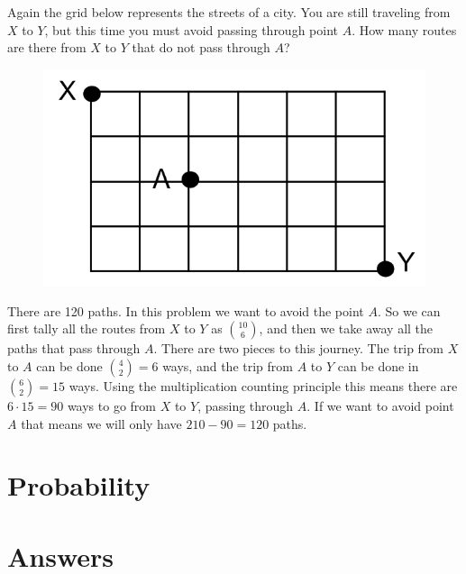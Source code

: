 \documentclass{amsbook}
\begin{document}
\begin{Exercise}[title={Paths on a Grid II}, difficulty=2, label=c2]
Again the grid below represents the streets of a city. You are still traveling from $X$ to $Y$, but this time you must avoid passing through point $A$. How many routes are there from $X$ to $Y$ that do not pass through $A$? 
\begin{figure}[H]
    \centering
    \includegraphics[scale=.55]{c.png}
\end{figure}
\end{Exercise}

\begin{Answer}[ref={c2}]
There are 120 paths. In this problem we want to avoid the point $A$. So we can first tally all the routes from $X$ to $Y$ as $10 \choose 6$, and then we take away all the paths that pass through $A$. There are two pieces to this journey. The trip from $X$ to $A$ can be done ${4 \choose 2} = 6$ ways, and the trip from $A$ to $Y$ can be done in ${6 \choose 2} =15$ ways. Using the multiplication counting principle this means there are $6\cdot 15 =90$ ways to go from $X$ to $Y$, passing through $A$. If we want to avoid point $A$ that means we will only have $210-90=120$ paths.
\end{Answer}



\chapter{Probability}


\chapter{Answers}
\shipoutAnswer
\end{document}
